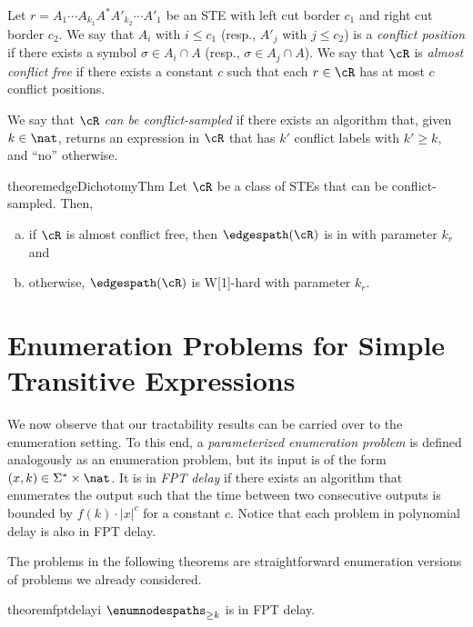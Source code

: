 \documentclass[a4paper,english]{lipics-v2016}
\theoremstyle{plain}
\begin{document}
Let $r = A_1 \cdots A_{k_1} A^* A'_{k_2} \cdots A'_1$ be an STE with left cut border $c_1$ and right cut border $c_2$. We say that $A_i$ with $i \leq c_1$ (resp., $A'_j$ with $j \leq c_2$) is a \emph{conflict position} if there exists a symbol $\sigma \in A_i \cap A$ (resp., $\sigma \in A_j \cap A$). We say that $\cR$ is \emph{almost conflict free} if there exists a constant $c$ such that each $r \in \cR$ has at most $c$ conflict positions. 


  
We say that $\cR$ \emph{can be conflict-sampled} if there exists
an algorithm that, given $k \in \nat$, returns an 
expression in $\cR$ that has $k'$ conflict labels with $k' \geq k$, and ``no'' otherwise.  
\begin{restatable}{theorem}{edgeDichotomyThm}\label{theo:edgedichotomy}
  Let $\cR$ be a class of STEs that can be conflict-sampled. Then,
  \begin{enumerate}[(a)]
  \item if $\cR$ is almost conflict free, then $\edgespath(\cR)$ is in \fpt with
    parameter $k_r$ and 
  \item otherwise, $\edgespath(\cR)$ is W[1]-hard with
    parameter $k_r$.  \end{enumerate}
\end{restatable}



 
\makeatletter{}\section{Enumeration Problems for Simple Transitive Expressions}\label{sec:enumfpt}

We now observe that our tractability results can be carried over to the enumeration setting. To this end, a \emph{parameterized enumeration problem} is defined analogously as an enumeration problem, but its input is of the form $(x,k) \in \Sigma^* \times \nat$. It is in \emph{FPT delay} if there exists an algorithm that enumerates the output such that the time between two consecutive outputs is bounded by $f(k)\cdot |x|^c$ for a constant $c$. Notice that each problem in polynomial delay is also in FPT delay. 


The problems in the following theorems are straightforward enumeration versions of problems we already considered. 
\begin{restatable}{theorem}{fptdelayi}\label{theo:fptdelay:1}
  $\enumnodespaths_{\geq k}$ is in FPT delay. 
\end{restatable}
\end{document}
